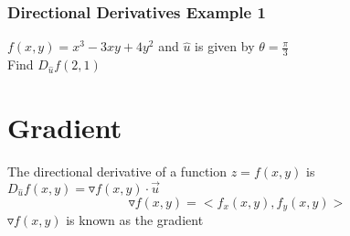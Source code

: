 \documentclass[12pt]{article}
\begin{document}
\subsubsection{Directional Derivatives Example 1}
\(f(x,y) = x^3 - 3xy + 4y^2\) and \(\hat{u}\) is given by \(\theta = \frac{\pi}{3}\)\\
Find \(D_{\hat{u}}f(2,1)\)

\section{Gradient}
The directional derivative of a function \(z=f(x,y)\) is \(D_{\hat{u}}f(x,y) = \triangledown f(x,y) \cdot \vec{u} \)
\[
	\triangledown f(x,y) = <f_x(x,y),f_y(x,y)>
\]
\(\triangledown f(x,y)\) is known as the gradient 
\end{document}
